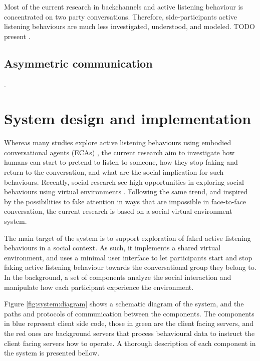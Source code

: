 \documentclass[]{simple-thesis}
\begin{document}
Most of the current research in backchannels and active listening behaviour is concentrated on two party conversations.
Therefore, side-participants active listening behaviours are much less investigated, understood, and modeled.
TODO present \citep{Matsusaka2003, Fujie2009}.

\section{Asymmetric communication}

\citep{Chou2016, Yee2007, Dominguez2014}.


\chapter{System design and implementation}\label{system_design_and_implementation}

Whereas many studies explore active listening behaviours using embodied conversational agents (ECAs) \citep{Nishimura2007, Bevacqua2008, Gratch2007, Huang2011, Lee2006, Poppe2013}, the current research aim to investigate how humans can start to pretend to listen to someone, how they stop faking and return to the conversation, and what are the social implication for such behaviours.
Recently, social research see high opportunities in exploring social behaviours using virtual environments \citep{Bailenson2008}.
Following the same trend, and inspired by the possibilities to fake attention in ways that are impossible in face-to-face conversation, the current research is based on a social virtual environment system.

The main target of the system is to support exploration of faked active listening behaviours in a social context.
As such, it implements a shared virtual environment, and uses a minimal user interface to let participants start and stop faking active listening behaviour towards the conversational group they belong to.
In the background, a set of components analyze the social interaction and manipulate how each participant experience the environment.

Figure \ref{fig:system:diagram} shows a schematic diagram of the system, and the paths and protocols of communication between the components.
The components in blue represent client side code, those in green are the client facing servers, and the red ones are background servers that process behavioural data to instruct the client facing servers how to operate.
A thorough description of each component in the system is presented bellow.
\end{document}
